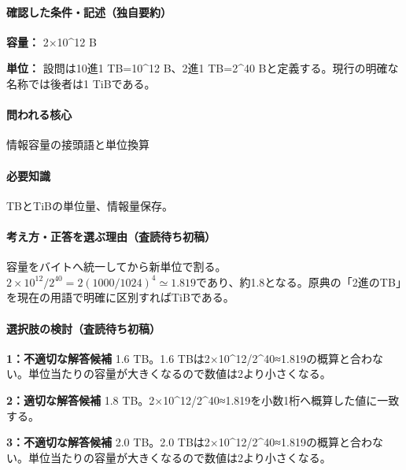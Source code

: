 \paragraph{確認した条件・記述（独自要約）}\mbox{}\par

\noindent\textbf{容量：} 2×10\textasciicircum{}12 B\par

\noindent\textbf{単位：} 設問は10進1 TB=\allowbreak{}10\textasciicircum{}12 B、2進1 TB=\allowbreak{}2\textasciicircum{}40 Bと定義する。現行の明確な名称では後者は1 TiBである。\par

\paragraph{問われる核心} 情報容量の接頭語と単位換算

\paragraph{必要知識} TBとTiBの単位量、情報量保存。

\paragraph{考え方・正答を選ぶ理由（査読待ち初稿）} 容量をバイトへ統一してから新単位で割る。\(2\times10^{12}/2^{40}=2(1000/1024)^4\simeq1.819\)であり、約1.8となる。原典の「2進のTB」を現在の用語で明確に区別すればTiBである。

\paragraph{選択肢の検討（査読待ち初稿）}\mbox{}\par

\noindent\textbf{1：不適切な解答候補} 1.6 TB。1.6 TBは2×10\textasciicircum{}12/2\textasciicircum{}40≈1.819の概算と合わない。単位当たりの容量が大きくなるので数値は2より小さくなる。\par

\noindent\textbf{2：適切な解答候補} 1.8 TB。2×10\textasciicircum{}12/2\textasciicircum{}40≈1.819を小数1桁へ概算した値に一致する。\par

\noindent\textbf{3：不適切な解答候補} 2.0 TB。2.0 TBは2×10\textasciicircum{}12/2\textasciicircum{}40≈1.819の概算と合わない。単位当たりの容量が大きくなるので数値は2より小さくなる。\par

